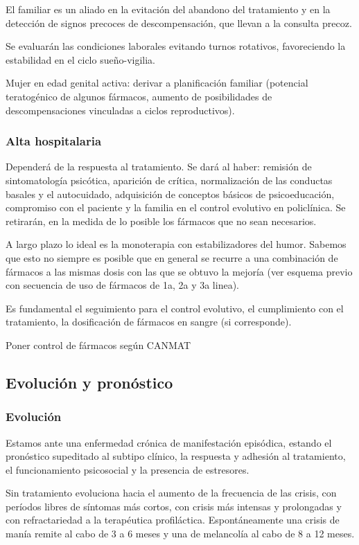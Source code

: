 \documentclass{scrbook}
\begin{document}
El familiar es un aliado en la evitación del abandono del tratamiento y en la detección de signos precoces de descompensación, que llevan a la consulta precoz.

Se evaluarán las condiciones laborales evitando turnos rotativos, favoreciendo la estabilidad en el ciclo sueño-vigilia.

Mujer en edad genital activa: derivar a planificación familiar (potencial teratogénico de algunos fármacos, aumento de posibilidades de descompensaciones vinculadas a ciclos reproductivos).
\subsubsection*{Alta hospitalaria}
Dependerá de la respuesta al tratamiento. Se dará al haber: remisión de sintomatología psicótica, aparición de crítica, normalización de las conductas basales y el autocuidado, adquisición de conceptos básicos de psicoeducación, compromiso con el paciente y la familia en el control evolutivo en policlínica. Se retirarán, en la medida de lo posible los fármacos que no sean necesarios.

A largo plazo lo ideal es la monoterapia con estabilizadores del humor. Sabemos que esto no siempre es posible que en general se recurre a una combinación de fármacos a las mismas dosis con las que se obtuvo la mejoría (ver esquema previo con secuencia de uso de fármacos de 1a, 2a y 3a linea).

Es fundamental el seguimiento para el control evolutivo, el cumplimiento con el tratamiento, la dosificación de fármacos en sangre (si corresponde).

\faTasks Poner control de fármacos según CANMAT

\subsection*{Evolución y pronóstico}
\subsubsection*{Evolución}
Estamos ante una enfermedad crónica de manifestación episódica, estando el pronóstico supeditado al subtipo clínico, la respuesta y adhesión al tratamiento, el funcionamiento psicosocial y la presencia de estresores.

Sin tratamiento evoluciona hacia el aumento de la frecuencia de las crisis, con períodos libres de síntomas más cortos, con crisis más intensas y prolongadas y con refractariedad a la terapéutica profiláctica. Espontáneamente una crisis de manía remite al cabo de 3 a 6 meses y una de melancolía al cabo de 8 a 12 meses.
\end{document}
